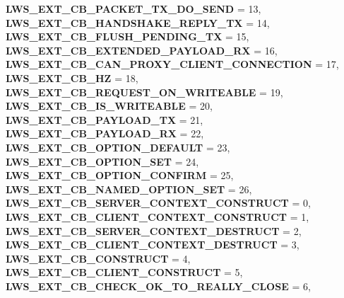 \begin{DoxyCompactItemize}
{\bfseries L\+W\+S\+\_\+\+E\+X\+T\+\_\+\+C\+B\+\_\+\+P\+A\+C\+K\+E\+T\+\_\+\+T\+X\+\_\+\+D\+O\+\_\+\+S\+E\+ND} = 13, 
{\bfseries L\+W\+S\+\_\+\+E\+X\+T\+\_\+\+C\+B\+\_\+\+H\+A\+N\+D\+S\+H\+A\+K\+E\+\_\+\+R\+E\+P\+L\+Y\+\_\+\+TX} = 14, 
{\bfseries L\+W\+S\+\_\+\+E\+X\+T\+\_\+\+C\+B\+\_\+\+F\+L\+U\+S\+H\+\_\+\+P\+E\+N\+D\+I\+N\+G\+\_\+\+TX} = 15, 
\newline
{\bfseries L\+W\+S\+\_\+\+E\+X\+T\+\_\+\+C\+B\+\_\+\+E\+X\+T\+E\+N\+D\+E\+D\+\_\+\+P\+A\+Y\+L\+O\+A\+D\+\_\+\+RX} = 16, 
{\bfseries L\+W\+S\+\_\+\+E\+X\+T\+\_\+\+C\+B\+\_\+\+C\+A\+N\+\_\+\+P\+R\+O\+X\+Y\+\_\+\+C\+L\+I\+E\+N\+T\+\_\+\+C\+O\+N\+N\+E\+C\+T\+I\+ON} = 17, 
{\bfseries L\+W\+S\+\_\+\+E\+X\+T\+\_\+\+C\+B\+\_\+HZ} = 18, 
{\bfseries L\+W\+S\+\_\+\+E\+X\+T\+\_\+\+C\+B\+\_\+\+R\+E\+Q\+U\+E\+S\+T\+\_\+\+O\+N\+\_\+\+W\+R\+I\+T\+E\+A\+B\+LE} = 19, 
\newline
{\bfseries L\+W\+S\+\_\+\+E\+X\+T\+\_\+\+C\+B\+\_\+\+I\+S\+\_\+\+W\+R\+I\+T\+E\+A\+B\+LE} = 20, 
{\bfseries L\+W\+S\+\_\+\+E\+X\+T\+\_\+\+C\+B\+\_\+\+P\+A\+Y\+L\+O\+A\+D\+\_\+\+TX} = 21, 
{\bfseries L\+W\+S\+\_\+\+E\+X\+T\+\_\+\+C\+B\+\_\+\+P\+A\+Y\+L\+O\+A\+D\+\_\+\+RX} = 22, 
{\bfseries L\+W\+S\+\_\+\+E\+X\+T\+\_\+\+C\+B\+\_\+\+O\+P\+T\+I\+O\+N\+\_\+\+D\+E\+F\+A\+U\+LT} = 23, 
\newline
{\bfseries L\+W\+S\+\_\+\+E\+X\+T\+\_\+\+C\+B\+\_\+\+O\+P\+T\+I\+O\+N\+\_\+\+S\+ET} = 24, 
{\bfseries L\+W\+S\+\_\+\+E\+X\+T\+\_\+\+C\+B\+\_\+\+O\+P\+T\+I\+O\+N\+\_\+\+C\+O\+N\+F\+I\+RM} = 25, 
{\bfseries L\+W\+S\+\_\+\+E\+X\+T\+\_\+\+C\+B\+\_\+\+N\+A\+M\+E\+D\+\_\+\+O\+P\+T\+I\+O\+N\+\_\+\+S\+ET} = 26, 
{\bfseries L\+W\+S\+\_\+\+E\+X\+T\+\_\+\+C\+B\+\_\+\+S\+E\+R\+V\+E\+R\+\_\+\+C\+O\+N\+T\+E\+X\+T\+\_\+\+C\+O\+N\+S\+T\+R\+U\+CT} = 0, 
\newline
{\bfseries L\+W\+S\+\_\+\+E\+X\+T\+\_\+\+C\+B\+\_\+\+C\+L\+I\+E\+N\+T\+\_\+\+C\+O\+N\+T\+E\+X\+T\+\_\+\+C\+O\+N\+S\+T\+R\+U\+CT} = 1, 
{\bfseries L\+W\+S\+\_\+\+E\+X\+T\+\_\+\+C\+B\+\_\+\+S\+E\+R\+V\+E\+R\+\_\+\+C\+O\+N\+T\+E\+X\+T\+\_\+\+D\+E\+S\+T\+R\+U\+CT} = 2, 
{\bfseries L\+W\+S\+\_\+\+E\+X\+T\+\_\+\+C\+B\+\_\+\+C\+L\+I\+E\+N\+T\+\_\+\+C\+O\+N\+T\+E\+X\+T\+\_\+\+D\+E\+S\+T\+R\+U\+CT} = 3, 
{\bfseries L\+W\+S\+\_\+\+E\+X\+T\+\_\+\+C\+B\+\_\+\+C\+O\+N\+S\+T\+R\+U\+CT} = 4, 
\newline
{\bfseries L\+W\+S\+\_\+\+E\+X\+T\+\_\+\+C\+B\+\_\+\+C\+L\+I\+E\+N\+T\+\_\+\+C\+O\+N\+S\+T\+R\+U\+CT} = 5, 
{\bfseries L\+W\+S\+\_\+\+E\+X\+T\+\_\+\+C\+B\+\_\+\+C\+H\+E\+C\+K\+\_\+\+O\+K\+\_\+\+T\+O\+\_\+\+R\+E\+A\+L\+L\+Y\+\_\+\+C\+L\+O\+SE} = 6, 

\end{DoxyCompactItemize}
